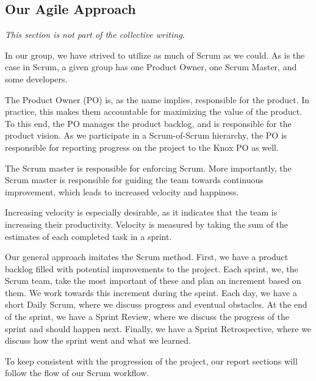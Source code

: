 \subsection{Our Agile Approach}\label{our_agile_approach}
\textit{This section is not part of the collective writing.}

In our group, we have strived to utilize as much of Scrum as we could.
As is the case in Scrum, a given group has one Product Owner, one Scrum Master, and some developers.

The Product Owner (PO) is, as the name implies, responsible for the product. In practice, this makes them accountable for maximizing the value of the product. To this end, the PO manages the product backlog, and is responsible for the product vision. As we participate in a Scrum-of-Scrum hierarchy, the PO is responsible for reporting progress on the project to the Knox PO as well.

The Scrum master is responsible for enforcing Scrum. More importantly, the Scrum master is responsible for guiding the team towards continuous improvement, which leads to increased velocity and happiness.

Increasing velocity is especially desirable, as it indicates that the team is increasing their productivity. Velocity is measured by taking the sum of the estimates of each completed task in a sprint.\cite{sutherlandScrumArtDoing2014} 

Our general approach imitates the Scrum method. First, we have a product backlog filled with potential improvements to the project. Each sprint, we, the Scrum team, take the most important of these and plan an increment based on them. We work towards this increment during the sprint. Each day, we have a short Daily Scrum, where we discuss progress and eventual obstacles. At the end of the sprint, we have a Sprint Review, where we discuss the progress of the sprint and should happen next. Finally, we have a Sprint Retrospective, where we discuss how the sprint went and what we learned.

To keep consistent with the progression of the project, our report sections will follow the flow of our Scrum workflow.